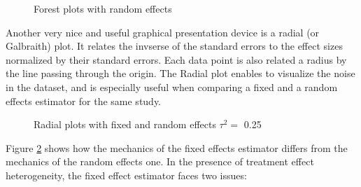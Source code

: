 \documentclass[]{book}
\newenvironment{Shaded}{\begin{snugshade}}{\end{snugshade}}
\newcommand{\DataTypeTok}[1]{\textcolor[rgb]{0.13,0.29,0.53}{#1}}
\newcommand{\FloatTok}[1]{\textcolor[rgb]{0.00,0.00,0.81}{#1}}
\newcommand{\KeywordTok}[1]{\textcolor[rgb]{0.13,0.29,0.53}{\textbf{#1}}}
\newcommand{\NormalTok}[1]{#1}
\newcommand{\OperatorTok}[1]{\textcolor[rgb]{0.81,0.36,0.00}{\textbf{#1}}}
\newcommand{\StringTok}[1]{\textcolor[rgb]{0.31,0.60,0.02}{#1}}
\theoremstyle{definition}
\theoremstyle{definition}
\theoremstyle{definition}
\theoremstyle{remark}
\begin{document}
\begin{figure}[htbp]

{\centering {}

}

\caption{Forest plots with random effects}\label{fig:RERMAmetafor}
\end{figure}

Another very nice and useful graphical presentation device is a radial (or Galbraith) plot.
It relates the invserse of the standard errors to the effect sizes normalized by their standard errors.
Each data point is also related a radius by the line passing through the origin.
The Radial plot enables to visualize the noise in the dataset, and is especially useful when comparing a fixed and a random effects estimator for the same study.

\begin{Shaded}
\end{Shaded}

\begin{figure}[htbp]

{\centering {}

}

\caption{Radial plots with fixed and random effects $\tau^2=$ 0.25}\label{fig:Radial}
\end{figure}

Figure \ref{fig:Radial} shows how the mechanics of the fixed effects estimator differs from the mechanics of the random effects one.
In the presence of treatment effect heterogeneity, the fixed effect estimator faces two issues:
\end{document}
